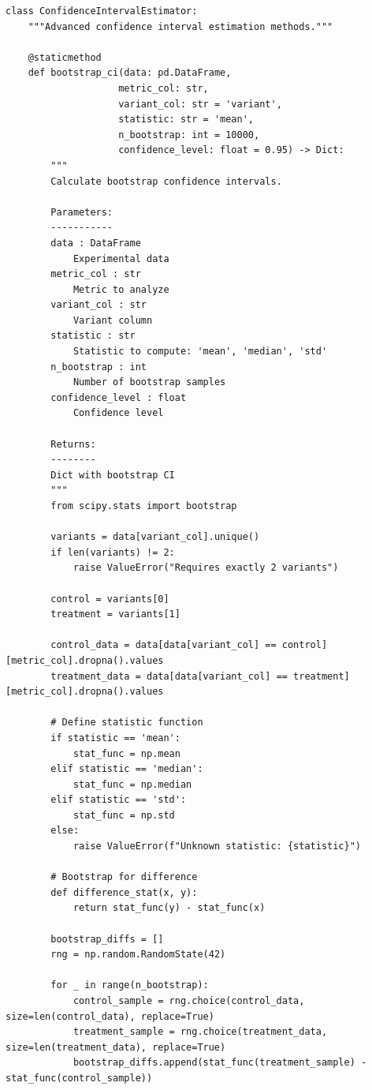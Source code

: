 \lstset{language=Python, caption=Advanced Confidence Interval Methods}
\begin{lstlisting}
class ConfidenceIntervalEstimator:
    """Advanced confidence interval estimation methods."""

    @staticmethod
    def bootstrap_ci(data: pd.DataFrame,
                    metric_col: str,
                    variant_col: str = 'variant',
                    statistic: str = 'mean',
                    n_bootstrap: int = 10000,
                    confidence_level: float = 0.95) -> Dict:
        """
        Calculate bootstrap confidence intervals.

        Parameters:
        -----------
        data : DataFrame
            Experimental data
        metric_col : str
            Metric to analyze
        variant_col : str
            Variant column
        statistic : str
            Statistic to compute: 'mean', 'median', 'std'
        n_bootstrap : int
            Number of bootstrap samples
        confidence_level : float
            Confidence level

        Returns:
        --------
        Dict with bootstrap CI
        """
        from scipy.stats import bootstrap

        variants = data[variant_col].unique()
        if len(variants) != 2:
            raise ValueError("Requires exactly 2 variants")

        control = variants[0]
        treatment = variants[1]

        control_data = data[data[variant_col] == control][metric_col].dropna().values
        treatment_data = data[data[variant_col] == treatment][metric_col].dropna().values

        # Define statistic function
        if statistic == 'mean':
            stat_func = np.mean
        elif statistic == 'median':
            stat_func = np.median
        elif statistic == 'std':
            stat_func = np.std
        else:
            raise ValueError(f"Unknown statistic: {statistic}")

        # Bootstrap for difference
        def difference_stat(x, y):
            return stat_func(y) - stat_func(x)

        bootstrap_diffs = []
        rng = np.random.RandomState(42)

        for _ in range(n_bootstrap):
            control_sample = rng.choice(control_data, size=len(control_data), replace=True)
            treatment_sample = rng.choice(treatment_data, size=len(treatment_data), replace=True)
            bootstrap_diffs.append(stat_func(treatment_sample) - stat_func(control_sample))


\end{lstlisting}
